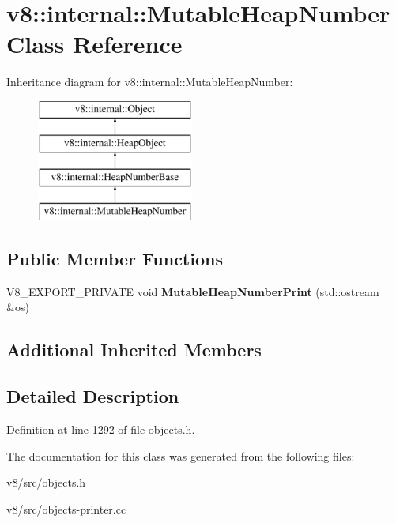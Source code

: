 \hypertarget{classv8_1_1internal_1_1MutableHeapNumber}{}\section{v8\+:\+:internal\+:\+:Mutable\+Heap\+Number Class Reference}
\label{classv8_1_1internal_1_1MutableHeapNumber}
Inheritance diagram for v8\+:\+:internal\+:\+:Mutable\+Heap\+Number\+:\begin{figure}[H]
\begin{center}
\leavevmode
\includegraphics[height=4.000000cm]{classv8_1_1internal_1_1MutableHeapNumber}
\end{center}
\end{figure}
\subsection*{Public Member Functions}
\begin{DoxyCompactItemize}
\item 
\mbox{\label{classv8_1_1internal_1_1MutableHeapNumber_a0dedadb4b0c9a7d9a3460b740969cedd}} 
V8\+\_\+\+E\+X\+P\+O\+R\+T\+\_\+\+P\+R\+I\+V\+A\+TE void {\bfseries Mutable\+Heap\+Number\+Print} (std\+::ostream \&os)
\end{DoxyCompactItemize}
\subsection*{Additional Inherited Members}


\subsection{Detailed Description}


Definition at line 1292 of file objects.\+h.



The documentation for this class was generated from the following files\+:\begin{DoxyCompactItemize}
\item 
v8/src/objects.\+h\item 
v8/src/objects-\/printer.\+cc\end{DoxyCompactItemize}
